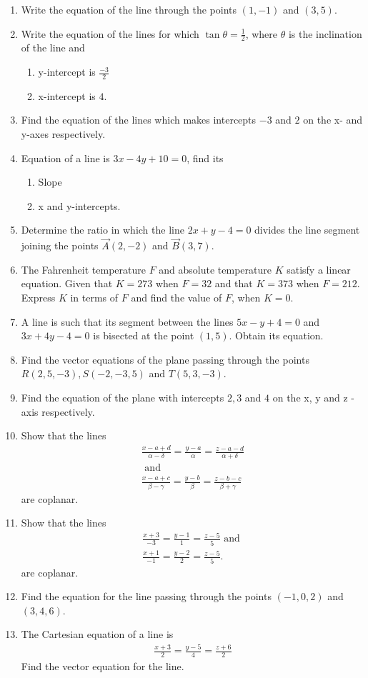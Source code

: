 \begin{enumerate}[label=\thesubsection.\arabic*, ref=\thesubsection.\theenumi]
\item Write the equation of the line through the points $(1,-1)$ and $(3,5)$.
\item Write the equation of the lines for which $\tan \theta=\frac{1}{2}$, where $\theta$ is the inclination of the line and
\begin{enumerate}
\item  y-intercept is $\frac{-3}{2}$ 
\item  x-intercept is $4$.
\end{enumerate}
\item Find the equation of the lines which makes intercepts $-3$ and $2$ on the x- and y-axes respectively.
\item Equation of a line is $3x-4y+10=0$, find its
\begin{enumerate}
\item  Slope
\item  x and y-intercepts.
\end{enumerate}
\item Determine the ratio in which the line $2x+y  - 4=0$ divides the line segment joining the points  $\vec{A}(2, - 2)$  and  $\vec{B}(3, 7)$.
\\
\solution
	
\item The Fahrenheit temperature $F$ and  absolute temperature $K$ satisfy a linear equation. Given that $K=273$ when $F=32$ and that $K=373$ when $F=212$. Express $K$ in terms of $F$ and find the value of $F$, when $K=0$.
\item A line is such that its segment between the lines $5x-y+4=0$ and $3x+4y-4=0$ is bisected at the point $(1,5)$. Obtain its equation.
\item Find the vector equations of the plane passing through the points $R(2, 5, -3), S(-2, -3, 5)$ and $T(5, 3, -3)$.
\item Find the equation of the plane with intercepts $2, 3$ and $4$ on the x, y and z - axis respectively.
\item Show that the lines 
\begin{align}
\frac{x-a+d}{\alpha -\delta} =\frac{y-a}{\alpha} =\frac{z-a-d}{\alpha +\delta}\\
 \text{  and } 
	\\
	\frac{x-a+c}{\beta -\gamma} =\frac{y -b}{\beta} =\frac{z-b-c}{\beta +\gamma} 
\end{align}
 are coplanar.
\item Show that the lines 
\begin{align}
\frac{x+3}{-3}= \frac{y-1}{1}= \frac{z-5}{5} \text{ and } 
	\\
	\frac{x+1}{-1} =\frac{y-2}{2} =\frac{z-5}{5}. 
\end{align}
are coplanar.
\item Find the equation for the line passing through the points $(-1, 0, 2)$ and $(3, 4, 6)$.
\item The Cartesian equation of a line is
\begin{align}
\frac{x+3}{2}= \frac{y-5}{4}= \frac{z+6}{2}
\end{align} 
Find the vector equation for the line.
\end{enumerate}
